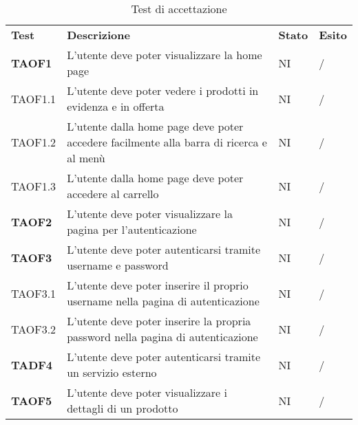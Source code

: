 \begin{center}
    \centering
    \renewcommand{\arraystretch}{1.8}
    \label{tab:TestAccettazione}
    \begin{longtable}[!h]{p{60px} p{240px} p{35px} p{35px}}
        \caption{Test di accettazione}                                                                                                                          \\
        \rowcolor{logo!70}
        \textbf{Test}   & \textbf{Descrizione}                                                                                & \textbf{Stato} & \textbf{Esito} \\
        \textbf{TAOF1}  & L'utente deve poter visualizzare la home page                                                       & NI             & /              \\
        TAOF1.1         & L'utente deve poter vedere i prodotti in evidenza e in offerta                                      & NI             & /              \\
        TAOF1.2         & L'utente dalla home page deve poter accedere facilmente alla barra di ricerca e al menù             & NI             & /              \\
        TAOF1.3         & L'utente dalla home page deve poter accedere al carrello                                            & NI             & /              \\
        \textbf{TAOF2}  & L'utente deve poter visualizzare la pagina per l'autenticazione                                     & NI             & /              \\
        \textbf{TAOF3}  & L'utente deve poter autenticarsi tramite username e password                                        & NI             & /              \\
        TAOF3.1         & L'utente deve poter inserire il proprio username nella pagina di autenticazione                     & NI             & /              \\
        TAOF3.2         & L'utente deve poter inserire la propria password nella pagina di autenticazione                     & NI             & /              \\
        \textbf{TADF4}  & L'utente deve poter autenticarsi tramite un servizio esterno                                        & NI             & /              \\
        \textbf{TAOF5}  & L'utente deve poter visualizzare i dettagli di un prodotto                                          & NI             & /              \\

\end{longtable}
\end{center}

